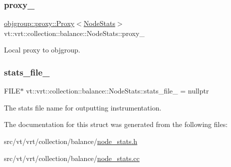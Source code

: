 \subsubsection{\texorpdfstring{proxy\+\_\+}{proxy\_}}
{\footnotesize\ttfamily \hyperlink{structvt_1_1objgroup_1_1proxy_1_1_proxy}{objgroup\+::proxy\+::\+Proxy}$<$\hyperlink{structvt_1_1vrt_1_1collection_1_1balance_1_1_node_stats}{Node\+Stats}$>$ vt\+::vrt\+::collection\+::balance\+::\+Node\+Stats\+::proxy\+\_\+\hspace{0.3cm}{\ttfamily [private]}}



Local proxy to objgroup. 

\mbox{\label{structvt_1_1vrt_1_1collection_1_1balance_1_1_node_stats_a8f2c59c675643634d8e4d2d5ba89ecbd}} 
\subsubsection{\texorpdfstring{stats\+\_\+file\+\_\+}{stats\_file\_}}
{\footnotesize\ttfamily F\+I\+LE$\ast$ vt\+::vrt\+::collection\+::balance\+::\+Node\+Stats\+::stats\+\_\+file\+\_\+ = nullptr\hspace{0.3cm}{\ttfamily [private]}}



The stats file name for outputting instrumentation. 



The documentation for this struct was generated from the following files\+:\begin{DoxyCompactItemize}
\item 
src/vt/vrt/collection/balance/\hyperlink{node__stats_8h}{node\+\_\+stats.\+h}\item 
src/vt/vrt/collection/balance/\hyperlink{node__stats_8cc}{node\+\_\+stats.\+cc}\end{DoxyCompactItemize}
